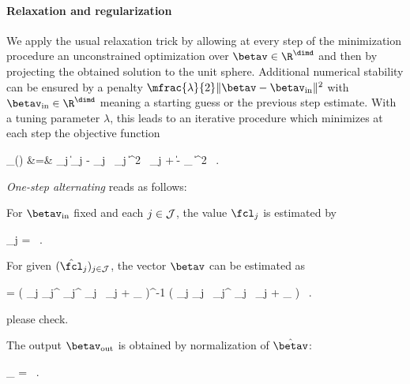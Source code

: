 \paragraph{Relaxation and regularization}
We apply the usual relaxation trick by allowing at every step of the minimization procedure 
an unconstrained optimization over \( \betav \in \R^{\dimd} \) and then by projecting 
the obtained solution to the unit sphere.
Additional numerical stability can be ensured 
by a penalty \( \mfrac{\lambda}{2} \| \betav - \betav_{\init} \|^{2} \) with 
\( \betav_{\init} \in \R^{\dimd} \)
meaning a starting guess or the previous step estimate.
With a tuning parameter \( \lambda \), this leads to an iterative procedure which minimizes at each step 
the objective function
\begin{EQA}
	\LL_{\lambda}(\prmtv)
	&=&
	 \sum_{j \in \JJJ} \bigl\| \Imav_{j} - \fcl_{j} \, \UV_{j} \betav \bigr\|^{2} \,	
	\neff_{j}
	+  \| \betav - \betav_{\init} \|^{2} 
	\, .
\label{tjjc7c6f5fd5e5erjwyhfd}
\end{EQA}
%
\emph{One-step alternating} reads as follows:

\begin{mylist}
\item
For \( \betav_{\init} \) fixed and each \( j \in \mathcal{J} \), the value \( \fcl_{j} \) is estimated by
\begin{EQA}[c]
	\hat{\fcl}_{j}
	=
	\, .
\end{EQA}

\item
For given \( (\hat{\fcl}_{j})_{j \in \JJJ} \), the vector \( \betav \) can be estimated as
\begin{EQA}[c]
	\hat{\betav}
	=
	\biggl( 
		\sum_{j \in \JJJ} \hat{\fcl}_{j}^{} \; \UV_{j}^{\T} \UV_{j} \,
		\neff_{j} 
		+ \lambda \Id_{\dimd} 
	\biggr)^{-1}
	\biggl( 
		\sum_{j \in \JJJ} \hat{\fcl}_{j} \, \UV_{j}^{\T} \Imav_{j} \, \neff_{j}
		+ \lambda \betav_{\init} 
	\biggr)
	\, .
\end{EQA}
{\color{blue} please check.}

\item
The output \( \betav_{\outp} \) is obtained by normalization of \( \hat{\betav} \):
\begin{EQA}[c]
	\betav_{\outp}
	=
	 \hat{\betav}
	\, .
\end{EQA}

\end{mylist}

